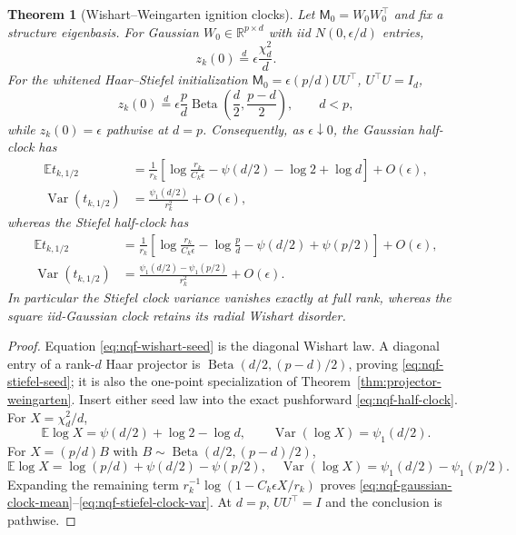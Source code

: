 \documentclass{article}
\newtheorem{theorem}{Theorem}[section]
\newcommand{\E}{\mathbb E}
\newcommand{\R}{\mathbb R}
\newcommand{\Var}{\operatorname{Var}}
\begin{document}
\begin{theorem}[Wishart--Weingarten ignition clocks]
\label{thm:nqf-clock-disorder}
Let \(\mathsf M_0=W_0W_0^\top\) and fix a structure eigenbasis.
For Gaussian \(W_0\in\R^{p\times d}\) with iid
\(N(0,\epsilon/d)\) entries,
\begin{equation}
z_k(0)\overset d=\epsilon\frac{\chi_d^2}{d}.
\label{eq:nqf-wishart-seed}
\end{equation}
For the whitened Haar--Stiefel initialization
\(\mathsf M_0=\epsilon(p/d)UU^\top\), \(U^\top U=I_d\),
\begin{equation}
z_k(0)\overset d=\epsilon\frac pd
\operatorname{Beta}\left(\frac d2,\frac{p-d}{2}\right),
\qquad d<p,
\label{eq:nqf-stiefel-seed}
\end{equation}
while \(z_k(0)=\epsilon\) pathwise at \(d=p\).  Consequently, as
\(\epsilon\downarrow0\), the Gaussian half-clock has
\begin{align}
\E t_{k,1/2}
&=\frac1{r_k}\left[
\log\frac{r_k}{C_k\epsilon}
-\psi(d/2)-\log2+\log d\right]+O(\epsilon),
\label{eq:nqf-gaussian-clock-mean}\\
\Var(t_{k,1/2})
&=\frac{\psi_1(d/2)}{r_k^2}+O(\epsilon),
\label{eq:nqf-gaussian-clock-var}
\end{align}
whereas the Stiefel half-clock has
\begin{align}
\E t_{k,1/2}
&=\frac1{r_k}\left[
\log\frac{r_k}{C_k\epsilon}-\log\frac pd
-\psi(d/2)+\psi(p/2)\right]+O(\epsilon),
\label{eq:nqf-stiefel-clock-mean}\\
\Var(t_{k,1/2})
&=\frac{\psi_1(d/2)-\psi_1(p/2)}{r_k^2}+O(\epsilon).
\label{eq:nqf-stiefel-clock-var}
\end{align}
In particular the Stiefel clock variance vanishes exactly at full rank,
whereas the square iid-Gaussian clock retains its radial Wishart disorder.
\end{theorem}

\begin{proof}
Equation \eqref{eq:nqf-wishart-seed} is the diagonal Wishart law.  A diagonal
entry of a rank-\(d\) Haar projector is
\(\operatorname{Beta}(d/2,(p-d)/2)\), proving
\eqref{eq:nqf-stiefel-seed}; it is also the one-point specialization of
Theorem~\ref{thm:projector-weingarten}.  Insert either seed law into the exact
pushforward \eqref{eq:nqf-half-clock}.  For
\(X=\chi_d^2/d\),
\begin{equation*}
\E\log X=\psi(d/2)+\log2-\log d,
\qquad \Var(\log X)=\psi_1(d/2).
\end{equation*}
For \(X=(p/d)B\) with
\(B\sim\operatorname{Beta}(d/2,(p-d)/2)\),
\begin{equation*}
\E\log X=\log(p/d)+\psi(d/2)-\psi(p/2),
\quad
\Var(\log X)=\psi_1(d/2)-\psi_1(p/2).
\end{equation*}
Expanding the remaining term
\(r_k^{-1}\log(1-C_k\epsilon X/r_k)\) proves
\eqref{eq:nqf-gaussian-clock-mean}--\eqref{eq:nqf-stiefel-clock-var}.
At \(d=p\), \(UU^\top=I\) and the conclusion is pathwise.
\end{proof}
\end{document}

